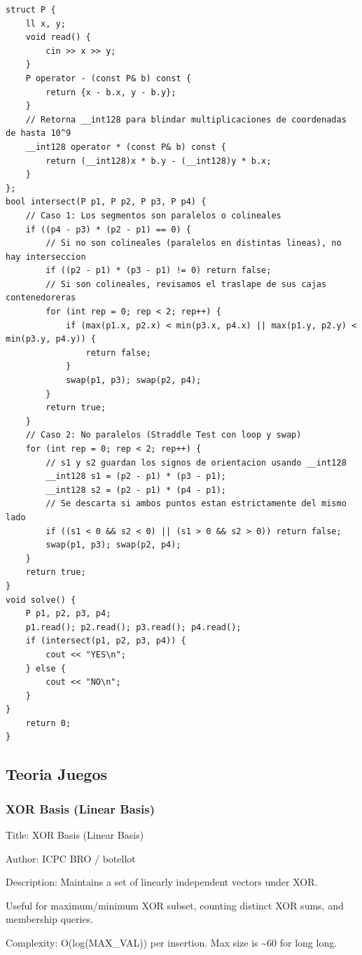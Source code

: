 \documentclass[10pt,landscape,twocolumn]{article}
\begin{document}
\begin{lstlisting}
struct P {
    ll x, y;
    void read() {
        cin >> x >> y;
    }
    P operator - (const P& b) const { 
        return {x - b.x, y - b.y}; 
    }
    // Retorna __int128 para blindar multiplicaciones de coordenadas de hasta 10^9
    __int128 operator * (const P& b) const { 
        return (__int128)x * b.y - (__int128)y * b.x; 
    }
};
bool intersect(P p1, P p2, P p3, P p4) {
    // Caso 1: Los segmentos son paralelos o colineales
    if ((p4 - p3) * (p2 - p1) == 0) {
        // Si no son colineales (paralelos en distintas lineas), no hay interseccion
        if ((p2 - p1) * (p3 - p1) != 0) return false;
        // Si son colineales, revisamos el traslape de sus cajas contenedoreras
        for (int rep = 0; rep < 2; rep++) {
            if (max(p1.x, p2.x) < min(p3.x, p4.x) || max(p1.y, p2.y) < min(p3.y, p4.y)) {
                return false;
            }
            swap(p1, p3); swap(p2, p4);
        }
        return true; 
    }
    // Caso 2: No paralelos (Straddle Test con loop y swap)
    for (int rep = 0; rep < 2; rep++) {
        // s1 y s2 guardan los signos de orientacion usando __int128
        __int128 s1 = (p2 - p1) * (p3 - p1);
        __int128 s2 = (p2 - p1) * (p4 - p1);
        // Se descarta si ambos puntos estan estrictamente del mismo lado
        if ((s1 < 0 && s2 < 0) || (s1 > 0 && s2 > 0)) return false;
        swap(p1, p3); swap(p2, p4);
    }
    return true;
}
void solve() {
    P p1, p2, p3, p4;
    p1.read(); p2.read(); p3.read(); p4.read();
    if (intersect(p1, p2, p3, p4)) {
        cout << "YES\n";
    } else {
        cout << "NO\n";
    }
}
    return 0;
}
\end{lstlisting}

\subsection{Teoria Juegos}

\subsubsection{XOR Basis (Linear Basis)}
\begin{flushleft}
\footnotesize\ttfamily
\par\noindent Title: XOR Basis (Linear Basis)
\par\noindent Author: ICPC BRO / botellot
\par\noindent Description: Maintains a set of linearly independent vectors under XOR.
\par\noindent Useful for maximum/minimum XOR subset, counting distinct XOR sums, and membership queries.
\par\noindent Complexity: O(log(MAX\_VAL)) per insertion. Max size is \textasciitilde{}60 for long long.
\end{flushleft}
\end{document}
